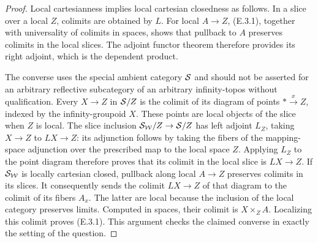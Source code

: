 \begin{proof}
Local cartesianness implies local cartesian closedness as
follows. In a slice over a local $Z$, colimits are obtained
by $L$. For local $A\to Z$, (E.3.1), together with universality
of colimits in spaces, shows that pullback to $A$ preserves
colimits in the local slices. The adjoint functor theorem
therefore provides its right adjoint, which is the dependent
product.

The converse uses the special ambient category $\mathcal{S}$ and
should not be asserted for an arbitrary reflective subcategory
of an arbitrary infinity-topos without qualification.
Every $X\to Z$ in $\mathcal{S}/Z$ is the colimit of its diagram of
points $*\xrightarrow{x}Z$, indexed by the infinity-groupoid
$X$. These points are local objects of the slice when $Z$ is
local. The slice inclusion $\mathcal{S}_{\mathcal{W}}/Z\to\mathcal{S}/Z$ has left
adjoint $L_Z$, taking $X\to Z$ to $LX\to Z$: its adjunction
follows by taking the fibers of the mapping-space adjunction
over the prescribed map to the local space $Z$. Applying
$L_Z$ to the point diagram therefore proves that its colimit
in the local slice is $LX\to Z$. If $\mathcal{S}_{\mathcal{W}}$ is locally cartesian closed, pullback
along local $A\to Z$ preserves colimits in its slices.
It consequently sends the colimit $LX\to Z$ of that diagram
to the colimit of its fibers $A_x$. The latter are local
because the inclusion of the local category preserves limits.
Computed in spaces, their colimit is $X\times_ZA$.
Localizing this colimit proves (E.3.1). This argument checks
the claimed converse in exactly the setting of the question.
\end{proof}

